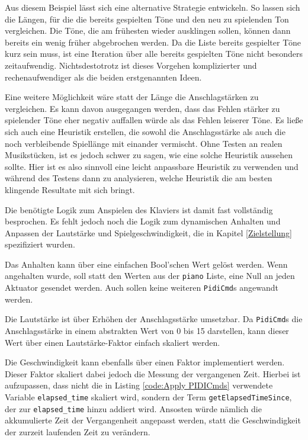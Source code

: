 Aus diesem Beispiel lässt sich eine alternative Strategie entwickeln.
So lassen sich die Längen, für die die bereits gespielten Töne und den neu zu spielenden Ton vergleichen.
Die Töne, die am frühesten wieder ausklingen sollen, können dann bereits ein wenig früher abgebrochen werden.
Da die Liste bereits gespielter Töne kurz sein muss, ist eine Iteration über alle bereits gespielten Töne nicht besonders zeitaufwendig.
Nichtsdestotrotz ist dieses Vorgehen komplizierter und rechenaufwendiger als die beiden erstgenannten Ideen.

Eine weitere Möglichkeit wäre statt der Länge die Anschlagstärken zu vergleichen.
Es kann davon ausgegangen werden, dass das Fehlen stärker zu spielender Töne eher negativ auffallen würde als das Fehlen leiserer Töne.
Es ließe sich auch eine Heuristik erstellen, die sowohl die Anschlagsstärke als auch die noch verbleibende Spiellänge mit einander vermischt.
Ohne Testen an realen Musikstücken, ist es jedoch schwer zu sagen, wie eine solche Heuristik aussehen sollte.
Hier ist es also sinnvoll eine leicht anpassbare Heuristik zu verwenden und während des Testens dann zu analysieren, welche Heuristik die am besten klingende Resultate mit sich bringt.

Die benötigte Logik zum Anspielen des Klaviers ist damit fast vollständig besprochen.
Es fehlt jedoch noch die Logik zum dynamischen Anhalten und Anpassen der Lautstärke und Spielgeschwindigkeit, die in Kapitel \ref{Zielstellung} spezifiziert wurden.

Das Anhalten kann über eine einfachen Bool'schen Wert gelöst werden.
Wenn angehalten wurde, soll statt den Werten aus der \lstinline{piano} Liste, eine Null an jeden Aktuator gesendet werden.
Auch sollen keine weiteren \lstinline{PidiCmd}s angewandt werden.

Die Lautstärke ist über Erhöhen der Anschlagsstärke umsetzbar.
Da \lstinline{PidiCmd}s die Anschlagsstärke in einem abstrakten Wert von 0 bis 15 darstellen, kann dieser Wert über einen Lautstärke-Faktor einfach skaliert werden.

Die Geschwindigkeit kann ebenfalls über einen Faktor implementiert werden.
Dieser Faktor skaliert dabei jedoch die Messung der vergangenen Zeit.
Hierbei ist aufzupassen, dass nicht die in Listing \ref{code:Apply PIDICmds} verwendete Variable \lstinline{elapsed_time} skaliert wird, sondern der Term \lstinline{getElapsedTimeSince}, der zur \lstinline{elapsed_time} hinzu addiert wird.
Ansosten würde nämlich die akkumulierte Zeit der Vergangenheit angepasst werden, statt die Geschwindigkeit der zurzeit laufenden Zeit zu verändern.


